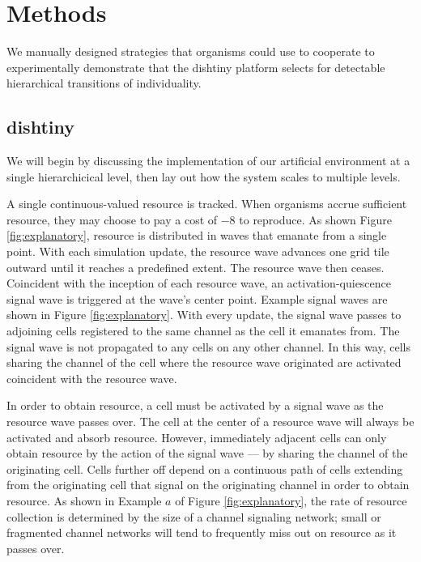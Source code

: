 \section{Methods}

We manually designed strategies that organisms could use to cooperate to experimentally demonstrate that the dishtiny platform selects for detectable hierarchical transitions of individuality.

\subsection{dishtiny}



We will begin by discussing the implementation of our artificial environment at a single hierarchicical level, then lay out how the system scales to multiple levels.

A single continuous-valued resource is tracked.
When organisms accrue sufficient resource, they may choose to pay a cost of $-8$ to reproduce.
As shown Figure \ref{fig:explanatory}, resource is distributed in waves that emanate from a single point.
With each simulation update, the resource wave advances one grid tile outward until it reaches a predefined extent.
The resource wave then ceases.
Coincident with the inception of each resource wave, an activation-quiescence signal wave is triggered at the wave's center point.
Example signal waves are shown in Figure \ref{fig:explanatory}.
With every update, the signal wave passes to adjoining cells registered to the same channel as the cell it emanates from.
The signal wave is not propagated to any cells on any other channel.
In this way, cells sharing the channel of the cell where the resource wave originated are activated coincident with the resource wave.

In order to obtain resource, a cell must be activated by a signal wave as the resource wave passes over.
The cell at the center of a resource wave will always be activated and absorb resource.
However, immediately adjacent cells can only obtain resource by the action of the signal wave --- by sharing the channel of the originating cell.
Cells further off depend on a continuous path of cells extending from the originating cell that signal on the originating channel in order to obtain resource.
As shown in Example $a$ of Figure \ref{fig:explanatory}, the rate of resource collection is determined by the size of a channel signaling network; small or fragmented channel networks will tend to frequently miss out on resource as it passes over.

